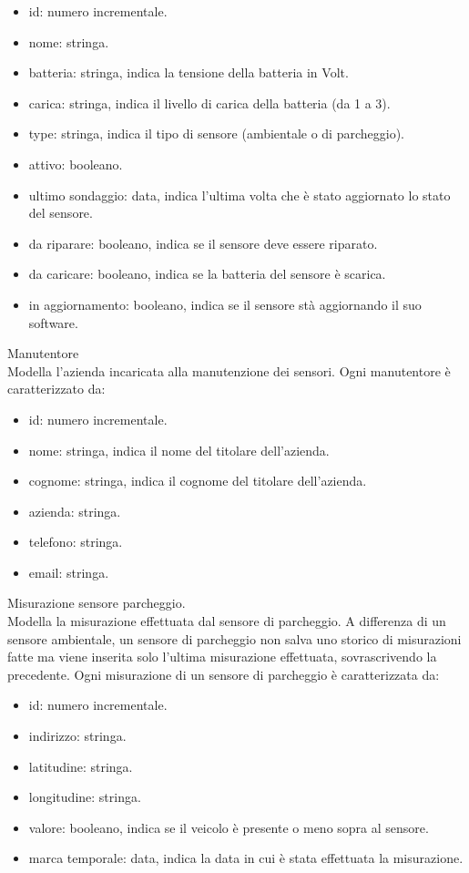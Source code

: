 \begin{itemize}
    \item id: numero incrementale.
    \item nome: stringa.
    \item batteria: stringa, indica la tensione della batteria in Volt.
    \item carica: stringa, indica il livello di carica della batteria (da 1 a 3).
    \item type: stringa, indica il tipo di sensore (ambientale o di parcheggio).
    \item attivo: booleano.
    \item ultimo sondaggio: data, indica l'ultima volta che è stato aggiornato lo stato del sensore.
    \item da riparare: booleano, indica se il sensore deve essere riparato.
    \item da caricare: booleano, indica se la batteria del sensore è scarica.
    \item in aggiornamento: booleano, indica se il sensore stà aggiornando il suo software.
\end{itemize}
\leavevmode\newline
Manutentore
\\
Modella l'azienda incaricata alla manutenzione dei sensori.
Ogni manutentore è caratterizzato da:
\begin{itemize}
    \item id: numero incrementale.
    \item nome: stringa, indica il nome del titolare dell'azienda.
    \item cognome: stringa, indica il cognome del titolare dell'azienda.
    \item azienda: stringa.
    \item telefono: stringa.
    \item email: stringa.
\end{itemize}
\leavevmode\newline
Misurazione sensore parcheggio.
\\
Modella la misurazione effettuata dal sensore di parcheggio. A differenza di un sensore ambientale, un sensore
di parcheggio non salva uno storico di misurazioni fatte ma viene inserita solo l'ultima misurazione effettuata,
sovrascrivendo la precedente.
Ogni misurazione di un sensore di parcheggio è caratterizzata da:
\begin{itemize}
    \item id: numero incrementale.
    \item indirizzo: stringa.
    \item latitudine: stringa.
    \item longitudine: stringa.
    \item valore: booleano, indica se il veicolo è presente o meno sopra al sensore.
    \item marca temporale: data, indica la data in cui è stata effettuata la misurazione.
\end{itemize}


